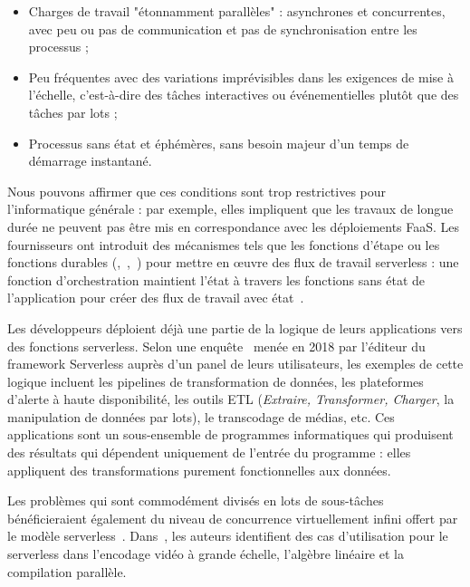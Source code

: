 \begin{itemize}
    \item Charges de travail "étonnamment parallèles" : asynchrones et concurrentes, avec peu ou pas de communication et pas de synchronisation entre les processus ;
    \item Peu fréquentes avec des variations imprévisibles dans les exigences de mise à l'échelle, c'est-à-dire des tâches interactives ou événementielles plutôt que des tâches par lots ;
    \item Processus sans état et éphémères, sans besoin majeur d'un temps de démarrage instantané.
\end{itemize}

Nous pouvons affirmer que ces conditions sont trop restrictives pour l'informatique générale : par exemple, elles impliquent que les travaux de longue durée ne peuvent pas être mis en correspondance avec les déploiements FaaS. Les fournisseurs ont introduit des mécanismes tels que les fonctions d'étape ou les fonctions durables (\cite{aws-step-functions},~\cite{azure-durable-functions},~\cite{google-workflows}) pour mettre en œuvre des flux de travail serverless : une fonction d'orchestration maintient l'état à travers les fonctions sans état de l'application pour créer des flux de travail avec état~\cite{burckhardtNetheriteEfficientExecution}.

Les développeurs déploient déjà une partie de la logique de leurs applications vers des fonctions serverless. Selon une enquête~\cite{serverless2018survey} menée en 2018 par l'éditeur du framework Serverless auprès d'un panel de leurs utilisateurs, les exemples de cette logique incluent les pipelines de transformation de données, les plateformes d'alerte à haute disponibilité, les outils ETL (\textit{Extraire, Transformer, Charger}, la manipulation de données par lots), le transcodage de médias, etc. Ces applications sont un sous-ensemble de programmes informatiques qui produisent des résultats qui dépendent uniquement de l'entrée du programme : elles appliquent des transformations purement fonctionnelles aux données.

Les problèmes qui sont commodément divisés en lots de sous-tâches bénéficieraient également du niveau de concurrence virtuellement infini offert par le modèle serverless~\cite{golecIFaaSBusSecurityPrivacyBased2022}. Dans~\cite{agacheFirecrackerLightweightVirtualization}, les auteurs identifient des cas d'utilisation pour le serverless dans l'encodage vidéo à grande échelle, l'algèbre linéaire et la compilation parallèle.

